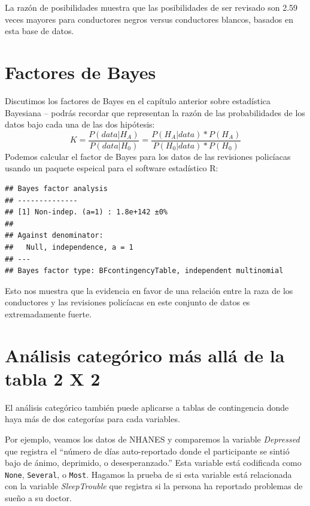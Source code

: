 \documentclass[
  12pt,
]{book}
\theoremstyle{definition}
\theoremstyle{definition}
\theoremstyle{definition}
\theoremstyle{remark}
\begin{document}
La razón de posibilidades muestra que las posibilidades de ser revisado son 2.59 veces mayores para conductores negros versus conductores blancos, basados en esta base de datos.

\hypertarget{factores-de-bayes}{%
\section{Factores de Bayes}\label{factores-de-bayes}}

Discutimos los factores de Bayes en el capítulo anterior sobre estadística Bayesiana -- podrás recordar que representan la razón de las probabilidades de los datos bajo cada una de las dos hipótesis:
\[ 
K = \frac{P(data|H_A)}{P(data|H_0)} = \frac{P(H_A|data)*P(H_A)}{P(H_0|data)*P(H_0)}
\]
Podemos calcular el factor de Bayes para los datos de las revisiones policíacas usando un paquete espeical para el software estadístico R:

\begin{verbatim}
## Bayes factor analysis
## --------------
## [1] Non-indep. (a=1) : 1.8e+142 ±0%
## 
## Against denominator:
##   Null, independence, a = 1 
## ---
## Bayes factor type: BFcontingencyTable, independent multinomial
\end{verbatim}

Esto nos muestra que la evidencia en favor de una relación entre la raza de los conductores y las revisiones policíacas en este conjunto de datos es extremadamente fuerte.

\hypertarget{anuxe1lisis-categuxf3rico-muxe1s-alluxe1-de-la-tabla-2-x-2}{%
\section{Análisis categórico más allá de la tabla 2 X 2}\label{anuxe1lisis-categuxf3rico-muxe1s-alluxe1-de-la-tabla-2-x-2}}

El análisis categórico también puede aplicarse a tablas de contingencia donde haya más de dos categorías para cada variables.

Por ejemplo, veamos los datos de NHANES y comparemos la variable \emph{Depressed} que registra el ``número de días auto-reportado donde el participante se sintió bajo de ánimo, deprimido, o desesperanzado.'' Esta variable está codificada como \texttt{None}, \texttt{Several}, o \texttt{Most}. Hagamos la prueba de si esta variable está relacionada con la variable \emph{SleepTrouble} que registra si la persona ha reportado problemas de sueño a su doctor.
\end{document}
